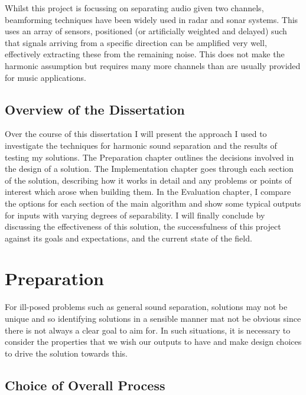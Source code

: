 \documentclass[12pt,a4paper,twoside,openright]{report}
\begin{document}
Whilst this project is focussing on separating audio given two channels, beamforming techniques have been widely used in radar and sonar systems. This uses an array of sensors, positioned (or artificially weighted and delayed) such that signals arriving from a specific direction can be amplified very well, effectively extracting these from the remaining noise. This does not make the harmonic assumption but requires many more channels than are usually provided for music applications.

\section{Overview of the Dissertation}

Over the course of this dissertation I will present the approach I used to investigate the techniques for harmonic sound separation and the results of testing my solutions. The Preparation chapter outlines the decisions involved in the design of a solution. The Implementation chapter goes through each section of the solution, describing how it works in detail and any problems or points of interest which arose when building them. In the Evaluation chapter, I compare the options for each section of the main algorithm and show some typical outputs for inputs with varying degrees of separability. I will finally conclude by discussing the effectiveness of this solution, the successfulness of this project against its goals and expectations, and the current state of the field.

\chapter{Preparation}

For ill-posed problems such as general sound separation, solutions may not be unique and so identifying solutions in a sensible manner mat not be obvious since there is not always a clear goal to aim for. In such situations, it is necessary to consider the properties that we wish our outputs to have and make design choices to drive the solution towards this.

\section{Choice of Overall Process}
\end{document}

